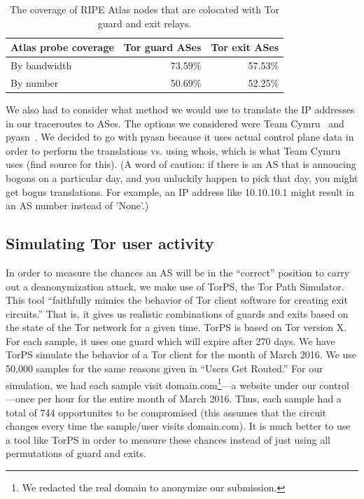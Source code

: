 
\begin{table}[t]
	\caption{The coverage of RIPE Atlas nodes that are colocated with Tor guard and exit
	relays.}
	\label{tab:atlas-coverage}
	\centering
	\begin{tabular}{l|r r}
	\toprule
	\textbf{Atlas probe coverage} & \textbf{Tor guard ASes} & \textbf{Tor exit ASes} \\
	\midrule
	By bandwidth & 73.59\% & 57.53\% \\
	By number & 50.69\% & 52.25\% \\
	\bottomrule
	\end{tabular}
\end{table}

We also had to consider what method we would use to translate the IP addresses in
our traceroutes to ASes. The options we considered were Team Cymru~\cite{ipasn}
and pyasn~\cite{pyasn}. We decided to go with pyasn because it uses actual
control plane data in order to perform the translations vs. using whois, which
is what Team Cymru uses (find source for this).  (A word of caution: if there is
an AS that is annoucing bogons on a particular day, and you unluckily happen to
pick that day, you might get bogus translations. For example, an IP address like
10.10.10.1 might result in an AS number instead of 'None'.)

\subsection{Simulating Tor user activity}
In order to measure the chances an AS will be in the ``correct'' position to carry out a
deanonymization attack, we make use of TorPS, the Tor Path Simulator. This tool 
``faithfully mimics the behavior of Tor client software for creating exit circuits.''
That is, it gives us realistic combinations of guards and exits based on the state of the 
Tor network for a given time. TorPS is based on Tor version X. For each sample, it uses 
one guard which will expire after 270 days. We have TorPS simulate the behavior of a Tor 
client for the month of March 2016. We use 50,000 samples for the same reasons given in
``Users Get Routed.''  For our simulation, we had each sample 
visit domain.com\footnote{We redacted the real domain to anonymize our
submission.}---a website under our control---once per hour for the entire month
of March 2016.  Thus, each sample had a total of 744 opportunites to be
compromised (this assumes that the circuit changes every time the sample/user
visits domain.com).  It is much better to use a tool like TorPS in order to
measure these chances instead of just using all permutations of guard and exits.

